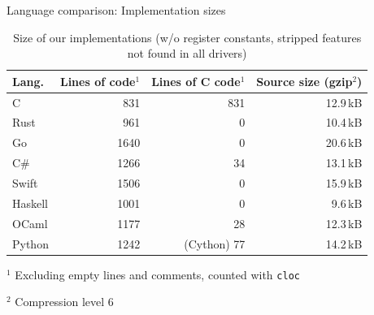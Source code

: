 \documentclass[NET,english,aspectratio=169,notitleframe]{tumbeamer}
\begin{document}
\begin{frame}{Language comparison: Implementation sizes}
\begin{table}[t]
 \setlength{\tabcolsep}{2mm}
	\centering
	\footnotesize
	\begin{tabular}{lrrr}
		\textbf{Lang.} & \textbf{Lines of code}$^1$ & \textbf{Lines of C code}$^1$  & \textbf{Source size (gzip$^2$)} \\
		\toprule
		C & 831 & 831 & 12.9\,kB  \\
		Rust & 961 & 0 & 10.4\,kB\\
		Go & 1640 & 0 & 20.6\,kB \\
		C\# & 1266 & 34 & 13.1\,kB\\
		Swift & 1506 & 0 & 15.9\,kB \\
		Haskell & 1001 & 0 &  9.6\,kB\\
		OCaml & 1177 & 28 &  12.3\,kB\\
		Python & 1242 & (Cython) 77 &14.2\,kB \\
		\bottomrule
	\end{tabular}
	\begin{tablenotes}
	\item $^1$ Excluding empty lines and comments, counted with \texttt{cloc}
	\item $^2$ Compression level 6
	\end{tablenotes}
	\caption{Size of our implementations (w/o register constants, stripped features not found in all drivers)}
	\label{tbl:lang-lines}
	\vspace{-3em}
\end{table}
\end{frame}
\end{document}
